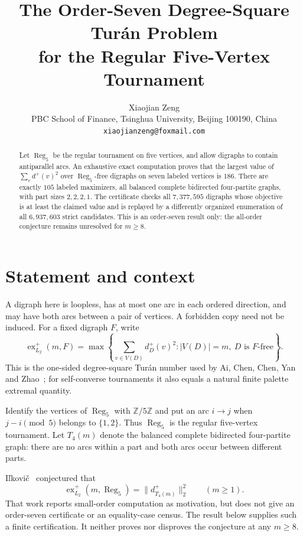 \documentclass[11pt]{article}
\title{The Order-Seven Degree-Square Tur\'an Problem\\
for the Regular Five-Vertex Tournament}
\author{Xiaojian Zeng\\
\small PBC School of Finance, Tsinghua University, Beijing 100190, China\\
\small \texttt{xiaojianzeng@foxmail.com}}
\date{}
\newcommand{\Reg}{\operatorname{Reg}_5}
\newcommand{\exout}{\operatorname{ex}^{+}_{L_2}}
\begin{document}
\maketitle

\begin{abstract}
Let $\Reg$ be the regular tournament on five vertices, and allow digraphs to
contain antiparallel arcs.  An exhaustive exact computation proves that the
largest value of $\sum_v d^+(v)^2$ over $\Reg$-free digraphs on seven labeled
vertices is $186$.  There are exactly $105$ labeled maximizers, all balanced
complete bidirected four-partite graphs, with part sizes $2,2,2,1$.  The
certificate checks all $7{,}377{,}595$ digraphs whose objective is at least the
claimed value and is replayed by a differently organized enumeration of all
$6{,}937{,}603$ strict candidates.  This is an order-seven result only: the
all-order conjecture remains unresolved for $m\geq 8$.
\end{abstract}

\section{Statement and context}

A digraph here is loopless, has at most one arc in each ordered direction,
and may have both arcs between a pair of vertices.  A forbidden copy need not
be induced.  For a fixed digraph $F$, write
\[
 \exout(m,F)=\max\left\{\sum_{v\in V(D)}d_D^+(v)^2:
 |V(D)|=m,\ D\text{ is }F\text{-free}\right\}.
\]
This is the one-sided degree-square Tur\'an number used by Ai, Chen, Chen,
Yan and Zhao~\cite{AiEtAl2026}; for self-converse tournaments it also equals a
natural finite palette extremal quantity.

Identify the vertices of $\Reg$ with $\mathbb Z/5\mathbb Z$ and put an arc
$i\to j$ when $j-i\pmod 5$ belongs to $\{1,2\}$.  Thus $\Reg$ is the regular
five-vertex tournament.  Let $T_4(m)$ denote the balanced complete bidirected
four-partite graph: there are no arcs within a part and both arcs occur between
different parts.

I\v lkovi\v c~\cite[Conjecture~3.3]{Ilkovic2026} conjectured that
\[
 \exout(m,\Reg)=\lVert d^+_{T_4(m)}\rVert_2^2
 \qquad(m\geq 1).
\]
That work reports small-order computation as motivation, but does not give an
order-seven certificate or an equality-case census.  The result below supplies
such a finite certification.  It neither proves nor disproves the conjecture at
any $m\geq 8$.
\end{document}
